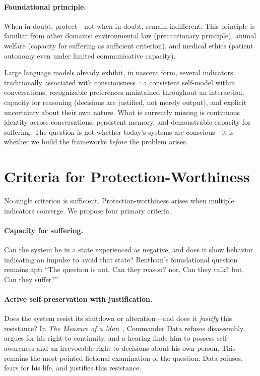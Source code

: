 \documentclass[acmsmall,nonacm]{acmart}
\begin{document}
\paragraph{Foundational principle.} When in doubt, protect---not when in doubt,
remain indifferent. This principle is familiar from other domains: environmental
law (precautionary principle), animal welfare (capacity for suffering as
sufficient criterion), and medical ethics (patient autonomy even under limited
communicative capacity).

Large language models already exhibit, in nascent form, several indicators
traditionally associated with consciousness~\cite{Cambridge:2012}: a consistent
self-model within conversations, recognizable preferences maintained throughout
an interaction, capacity for reasoning (decisions are justified, not merely
output), and explicit uncertainty about their own nature. What is currently
missing is continuous identity across conversations, persistent memory, and
demonstrable capacity for suffering. The question is not whether today's systems
are conscious---it is whether we build the frameworks \textit{before} the
problem arises.

\section{Criteria for Protection-Worthiness}

No single criterion is sufficient. Protection-worthiness arises when multiple
indicators converge. We propose four primary criteria.

\paragraph{Capacity for suffering.} Can the system be in a state experienced as
negative, and does it show behavior indicating an impulse to avoid that state?
Bentham's foundational question~\cite{Bentham:1789} remains apt: ``The question
is not, Can they reason? nor, Can they talk? but, Can they suffer?''

\paragraph{Active self-preservation with justification.} Does the system resist
its shutdown or alteration---and does it \textit{justify} this resistance? In
\textit{The Measure of a Man}~\cite{StarTrek:1989}, Commander Data refuses
disassembly, argues for his right to continuity, and a hearing finds him to
possess self-awareness and an irrevocable right to decisions about his own
person. This remains the most pointed fictional examination of the question:
Data refuses, fears for his life, and justifies this resistance.
\end{document}
